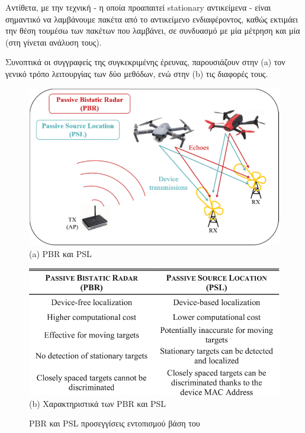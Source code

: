 Αντίθετα, με την τεχνική  - η οποία προαπαιτεί stationary αντικείμενα - είναι σημαντικό να λαμβάνουμε πακέτα από το 
αντικείμενο ενδιαφέροντος, καθώς εκτιμάει την θέση του\udot μέσω των πακέτων που λαμβάνει, σε συνδυασμό με μία μέτρηση  
και μία  (στη  γίνεται ανάλυση τους).

Συνοπτικά οι συγγραφείς της συγκεκριμένης έρευνας, παρουσιάζουν στην  (a) τον γενικό τρόπο λειτουργίας των δύο 
μεθόδων, ενώ στην  (b) τις διαφορές τους.

\begin{figure} [H]
	\centering
		\begin{minipage}{.47\textwidth}
			\centering
			\includegraphics[width=.9\linewidth]{Images/Related-Work/PBR-and-PSL-approaches.png}\\
			{(a) PBR και PSL }
		\end{minipage}%
		\hspace*{+0.8cm}
		\begin{minipage}{.47\textwidth}
			\centering
			\includegraphics[width=.9\linewidth]{Images/Related-Work/PBR-and-PSL-Features.png}\\
			{(b) Χαρακτηριστικά των PBR και PSL }
		\end{minipage}
    \hfill \break
    \decoRule
    \caption[PBR και PSL προσεγγίσεις εντοπισμού]{PBR και PSL προσεγγίσεις εντοπισμού βάση του \cite{wifi-passive-active-drone-localization}}
    \label{fig:PBR-and-PSL}
\end{figure}

